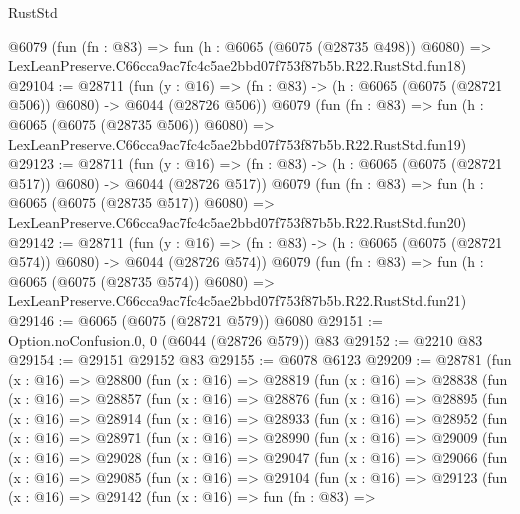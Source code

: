 \begin{lexlean}{RustStd}
\begin{coremodule}
    @6079
    (fun (fn : @83) =>
    fun (h : @6065 (@6075 (@28735 @498)) @6080) =>
    LexLeanPreserve.C66cca9ac7fc4c5ae2bbd07f753f87b5b.R22.RustStd.fun18)
@29104 := @28711
    (fun (y : @16) => (fn : @83) -> (h : @6065 (@6075 (@28721 @506)) @6080) -> @6044 (@28726 @506))
    @6079
    (fun (fn : @83) =>
    fun (h : @6065 (@6075 (@28735 @506)) @6080) =>
    LexLeanPreserve.C66cca9ac7fc4c5ae2bbd07f753f87b5b.R22.RustStd.fun19)
@29123 := @28711
    (fun (y : @16) => (fn : @83) -> (h : @6065 (@6075 (@28721 @517)) @6080) -> @6044 (@28726 @517))
    @6079
    (fun (fn : @83) =>
    fun (h : @6065 (@6075 (@28735 @517)) @6080) =>
    LexLeanPreserve.C66cca9ac7fc4c5ae2bbd07f753f87b5b.R22.RustStd.fun20)
@29142 := @28711
    (fun (y : @16) => (fn : @83) -> (h : @6065 (@6075 (@28721 @574)) @6080) -> @6044 (@28726 @574))
    @6079
    (fun (fn : @83) =>
    fun (h : @6065 (@6075 (@28735 @574)) @6080) =>
    LexLeanPreserve.C66cca9ac7fc4c5ae2bbd07f753f87b5b.R22.RustStd.fun21)
@29146 := @6065 (@6075 (@28721 @579)) @6080
@29151 := Option.noConfusion.{0, 0} (@6044 (@28726 @579)) @83
@29152 := @2210 @83
@29154 := @29151 @29152 @83
@29155 := @6078 @6123
@29209 := @28781
    (fun (x : @16) =>
    @28800
      (fun (x : @16) =>
      @28819
        (fun (x : @16) =>
        @28838
          (fun (x : @16) =>
          @28857
            (fun (x : @16) =>
            @28876
              (fun (x : @16) =>
              @28895
                (fun (x : @16) =>
                @28914
                  (fun (x : @16) =>
                  @28933
                    (fun (x : @16) =>
                    @28952
                      (fun (x : @16) =>
                      @28971
                        (fun (x : @16) =>
                        @28990
                          (fun (x : @16) =>
                          @29009
                            (fun (x : @16) =>
                            @29028
                              (fun (x : @16) =>
                              @29047
                                (fun (x : @16) =>
                                @29066
                                  (fun (x : @16) =>
                                  @29085
                                    (fun (x : @16) =>
                                    @29104
                                      (fun (x : @16) =>
                                      @29123
                                        (fun (x : @16) =>
                                        @29142
                                          (fun (x : @16) =>
                                          fun (fn : @83) =>

\end{coremodule}
\end{lexlean}
